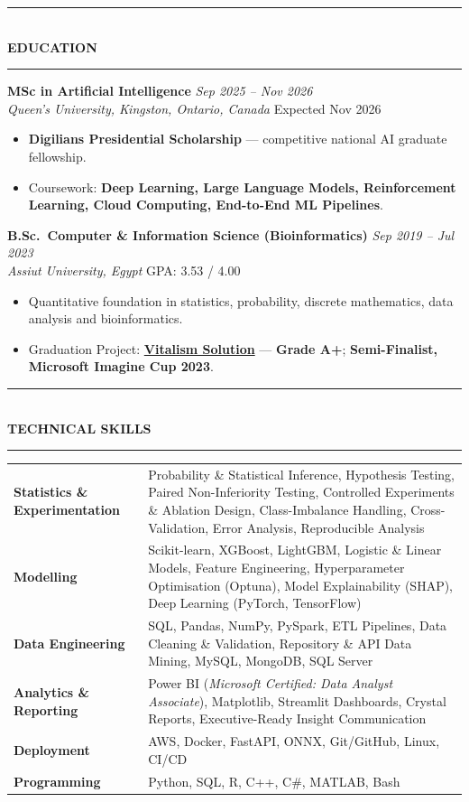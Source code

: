 \documentclass[10pt, a4paper]{article}
\newcommand{\cvsection}[1]{%
  \vspace{3pt}%
  {\color{navy}\rule{\linewidth}{1.1pt}}\\[0.5pt]%
  {\color{navy}\bfseries\fontsize{9.5}{11}\selectfont\uppercase{#1}}\\[-4pt]%
  {\color{teal}\rule{\linewidth}{0.6pt}}%
  \vspace{2pt}%
}
\newcommand{\cventry}[4]{%
  \vspace{2.5pt}%
  \textbf{\color{darkgray}#1} \hfill {\color{midgray}\textit{#3}}\\[-1.5pt]%
  {\color{teal}\textit{#2}} \hfill {\color{midgray}#4}%
}
\newenvironment{cvitems}{%
  \begin{itemize}[leftmargin=11pt, itemsep=0.5pt, parsep=0pt, topsep=1pt,
                  label={\textcolor{teal}{$\bullet$}}]
}{%
  \end{itemize}%
}
\begin{document}
\cvsection{Education}

\cventry{MSc in Artificial Intelligence}{Queen's University, Kingston, Ontario, Canada}
        {Sep 2025 -- Nov 2026}{Expected Nov 2026}
\begin{cvitems}
  \item \textbf{Digilians Presidential Scholarship} --- competitive national AI graduate fellowship.
  \item Coursework: \textbf{Deep Learning, Large Language Models, Reinforcement Learning, Cloud Computing, End-to-End ML Pipelines}.
\end{cvitems}

\cventry{B.Sc.\ Computer \& Information Science (Bioinformatics)}{Assiut University, Egypt}
        {Sep 2019 -- Jul 2023}{GPA: 3.53 / 4.00}
\begin{cvitems}
  \item Quantitative foundation in statistics, probability, discrete mathematics, data analysis and bioinformatics.
  \item Graduation Project: \href{https://vitalismsolution.github.io/}{\textbf{Vitalism Solution}} --- \textbf{Grade A+}; \textbf{Semi-Finalist, Microsoft Imagine Cup 2023}.
\end{cvitems}

\cvsection{Technical Skills}

\renewcommand{\arraystretch}{1.1}
\begin{tabularx}{\linewidth}{@{}>{\raggedright\hyphenpenalty=10000\arraybackslash}p{35mm} X@{}}
\textbf{Statistics \& Experimentation} &
Probability \& Statistical Inference, Hypothesis Testing, Paired Non-Inferiority Testing, Controlled Experiments \& Ablation Design, Class-Imbalance Handling, Cross-Validation, Error Analysis, Reproducible Analysis \\

\textbf{Modelling} &
Scikit-learn, XGBoost, LightGBM, Logistic \& Linear Models, Feature Engineering, Hyperparameter Optimisation (Optuna), Model Explainability (SHAP), Deep Learning (PyTorch, TensorFlow) \\

\textbf{Data Engineering} &
SQL, Pandas, NumPy, PySpark, ETL Pipelines, Data Cleaning \& Validation, Repository \& API Data Mining, MySQL, MongoDB, SQL Server \\

\textbf{Analytics \& Reporting} &
Power BI (\textit{Microsoft Certified: Data Analyst Associate}), Matplotlib, Streamlit Dashboards, Crystal Reports, Executive-Ready Insight Communication \\

\textbf{Deployment} &
AWS, Docker, FastAPI, ONNX, Git/GitHub, Linux, CI/CD \\

\textbf{Programming} &
Python, SQL, R, C++, C\#, MATLAB, Bash \\
\end{tabularx}
\end{document}
